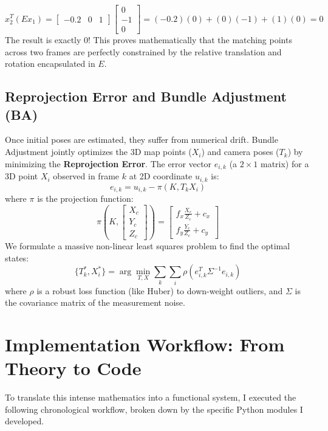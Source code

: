 \documentclass[12pt]{article}
\begin{document}
\begin{equation}
    x_2^T (E x_1) = \begin{bmatrix} -0.2 & 0 & 1 \end{bmatrix} \begin{bmatrix} 0 \\ -1 \\ 0 \end{bmatrix} = (-0.2)(0) + (0)(-1) + (1)(0) = 0
\end{equation}
The result is exactly 0! This proves mathematically that the matching points across two frames are perfectly constrained by the relative translation and rotation encapsulated in $E$.

\subsection{Reprojection Error and Bundle Adjustment (BA)}
Once initial poses are estimated, they suffer from numerical drift. Bundle Adjustment jointly optimizes the 3D map points ($X_i$) and camera poses ($T_k$) by minimizing the \textbf{Reprojection Error}. 
The error vector $e_{i,k}$ (a $2 \times 1$ matrix) for a 3D point $X_i$ observed in frame $k$ at 2D coordinate $u_{i,k}$ is:
\begin{equation}
    e_{i,k} = u_{i,k} - \pi(K, T_k X_i)
\end{equation}
where $\pi$ is the projection function:
\begin{equation}
    \pi \left( K, \begin{bmatrix} X_c \\ Y_c \\ Z_c \end{bmatrix} \right) = \begin{bmatrix} f_x \frac{X_c}{Z_c} + c_x \\ f_y \frac{Y_c}{Z_c} + c_y \end{bmatrix}
\end{equation}
We formulate a massive non-linear least squares problem to find the optimal states:
\begin{equation}
    \{T_k^*, X_i^*\} = \arg\min_{T,X} \sum_{k} \sum_{i} \rho (e_{i,k}^T \Sigma^{-1} e_{i,k})
\end{equation}
where $\rho$ is a robust loss function (like Huber) to down-weight outliers, and $\Sigma$ is the covariance matrix of the measurement noise.

\section{Implementation Workflow: From Theory to Code}
To translate this intense mathematics into a functional system, I executed the following chronological workflow, broken down by the specific Python modules I developed.
\end{document}
